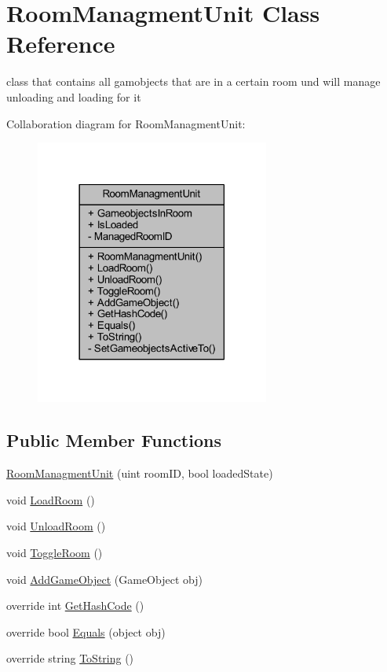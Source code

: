 \hypertarget{class_room_managment_unit}{}\section{Room\+Managment\+Unit Class Reference}
\label{class_room_managment_unit}


class that contains all gamobjects that are in a certain room und will manage unloading and loading for it  




Collaboration diagram for Room\+Managment\+Unit\+:
\nopagebreak
\begin{figure}[H]
\begin{center}
\leavevmode
\includegraphics[width=218pt]{class_room_managment_unit__coll__graph}
\end{center}
\end{figure}
\subsection*{Public Member Functions}
\begin{DoxyCompactItemize}
\item 
\mbox{\hyperlink{class_room_managment_unit_ad9c4cf6c496f32f6e0edbe47a4bf0295}{Room\+Managment\+Unit}} (uint room\+ID, bool loaded\+State)
\item 
void \mbox{\hyperlink{class_room_managment_unit_a7f34dfb62166ebcbd2a314f0bcdb61e9}{Load\+Room}} ()
\item 
void \mbox{\hyperlink{class_room_managment_unit_a45c039de8a79db7ada5831e0abeda972}{Unload\+Room}} ()
\item 
void \mbox{\hyperlink{class_room_managment_unit_a6043074719f8d67150cbfcff4c7a4cec}{Toggle\+Room}} ()
\item 
void \mbox{\hyperlink{class_room_managment_unit_ac7f3f62eb0e6f9f0bb239266796a323a}{Add\+Game\+Object}} (Game\+Object obj)
\item 
override int \mbox{\hyperlink{class_room_managment_unit_ad76ae60e41c36a71934ff9cccca60039}{Get\+Hash\+Code}} ()
\item 
override bool \mbox{\hyperlink{class_room_managment_unit_a663946fa33bad407b32d75aea8e7d5d9}{Equals}} (object obj)
\item 
override string \mbox{\hyperlink{class_room_managment_unit_af1299b6fbb2496cc4cb0e14a95cc2b9c}{To\+String}} ()
\end{DoxyCompactItemize}

